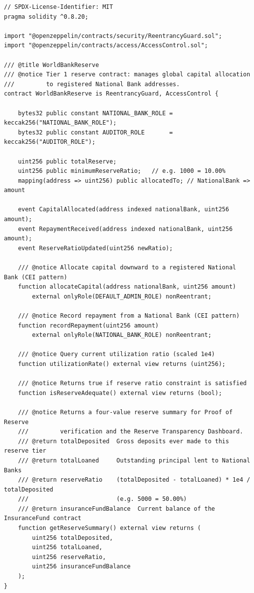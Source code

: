 \documentclass[12pt,a4paper]{report}
\begin{document}
\begin{lstlisting}[language=Solidity,basicstyle=\ttfamily\scriptsize,breaklines=true,
    commentstyle=\color{GrayText},keywordstyle=\color{PrimaryBlue}\bfseries,
    frame=single,rulecolor=\color{AccentBlue!40},captionpos=b,
    caption={WorldBankReserve.sol -- Tier 1 public interface. Full implementation in project repository.}]
// SPDX-License-Identifier: MIT
pragma solidity ^0.8.20;

import "@openzeppelin/contracts/security/ReentrancyGuard.sol";
import "@openzeppelin/contracts/access/AccessControl.sol";

/// @title WorldBankReserve
/// @notice Tier 1 reserve contract: manages global capital allocation
///         to registered National Bank addresses.
contract WorldBankReserve is ReentrancyGuard, AccessControl {

    bytes32 public constant NATIONAL_BANK_ROLE = keccak256("NATIONAL_BANK_ROLE");
    bytes32 public constant AUDITOR_ROLE       = keccak256("AUDITOR_ROLE");

    uint256 public totalReserve;
    uint256 public minimumReserveRatio;   // e.g. 1000 = 10.00%
    mapping(address => uint256) public allocatedTo; // NationalBank => amount

    event CapitalAllocated(address indexed nationalBank, uint256 amount);
    event RepaymentReceived(address indexed nationalBank, uint256 amount);
    event ReserveRatioUpdated(uint256 newRatio);

    /// @notice Allocate capital downward to a registered National Bank (CEI pattern)
    function allocateCapital(address nationalBank, uint256 amount)
        external onlyRole(DEFAULT_ADMIN_ROLE) nonReentrant;

    /// @notice Record repayment from a National Bank (CEI pattern)
    function recordRepayment(uint256 amount)
        external onlyRole(NATIONAL_BANK_ROLE) nonReentrant;

    /// @notice Query current utilization ratio (scaled 1e4)
    function utilizationRate() external view returns (uint256);

    /// @notice Returns true if reserve ratio constraint is satisfied
    function isReserveAdequate() external view returns (bool);

    /// @notice Returns a four-value reserve summary for Proof of Reserve
    ///         verification and the Reserve Transparency Dashboard.
    /// @return totalDeposited  Gross deposits ever made to this reserve tier
    /// @return totalLoaned     Outstanding principal lent to National Banks
    /// @return reserveRatio    (totalDeposited - totalLoaned) * 1e4 / totalDeposited
    ///                         (e.g. 5000 = 50.00%)
    /// @return insuranceFundBalance  Current balance of the InsuranceFund contract
    function getReserveSummary() external view returns (
        uint256 totalDeposited,
        uint256 totalLoaned,
        uint256 reserveRatio,
        uint256 insuranceFundBalance
    );
}
\end{lstlisting}
\end{document}
